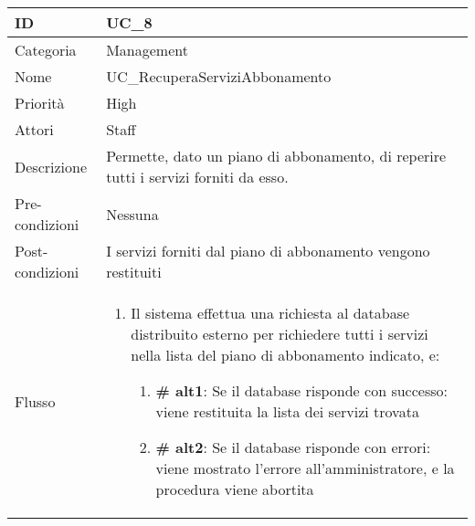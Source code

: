 \begin{center}
\begin{tabular}{ |p{2cm}|p{13cm}|  }
\hline
ID & UC\_8 \\\hline
Categoria & Management\\\hline
Nome & UC\_RecuperaServiziAbbonamento\\\hline
Priorità & High \\\hline
Attori &  Staff \\\hline
Descrizione & Permette, dato un piano di abbonamento, di reperire tutti i servizi forniti da esso.\\\hline
Pre-condizioni &  Nessuna\\\hline
Post-condizioni &  I servizi forniti dal piano di abbonamento vengono restituiti \\\hline
Flusso &  	\begin{enumerate}
			\item Il sistema effettua una richiesta al database distribuito esterno per richiedere tutti i servizi nella lista del piano di abbonamento indicato, e:
				\begin{enumerate}[  ]
				\item \textbf{\# alt1}: Se il database risponde con successo: viene restituita la lista dei servizi trovata
				\item \textbf{\# alt2}: Se il database risponde con errori: viene mostrato l'errore all'amministratore, e la procedura viene abortita
				\end{enumerate}
		\end{enumerate}\\\hline
\end{tabular}
\label{table_use_case:8}\newline



\end{center}
